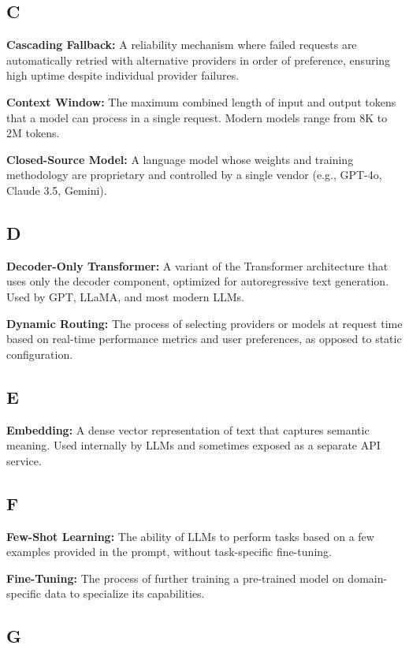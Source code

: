 \documentclass[english]{article}
\begin{document}
\subsection*{C}

\textbf{Cascading Fallback:} A reliability mechanism where failed requests are automatically retried with alternative providers in order of preference, ensuring high uptime despite individual provider failures.

\textbf{Context Window:} The maximum combined length of input and output tokens that a model can process in a single request. Modern models range from 8K to 2M tokens.

\textbf{Closed-Source Model:} A language model whose weights and training methodology are proprietary and controlled by a single vendor (e.g., GPT-4o, Claude 3.5, Gemini).

\subsection*{D}

\textbf{Decoder-Only Transformer:} A variant of the Transformer architecture that uses only the decoder component, optimized for autoregressive text generation. Used by GPT, LLaMA, and most modern LLMs.

\textbf{Dynamic Routing:} The process of selecting providers or models at request time based on real-time performance metrics and user preferences, as opposed to static configuration.

\subsection*{E}

\textbf{Embedding:} A dense vector representation of text that captures semantic meaning. Used internally by LLMs and sometimes exposed as a separate API service.

\subsection*{F}

\textbf{Few-Shot Learning:} The ability of LLMs to perform tasks based on a few examples provided in the prompt, without task-specific fine-tuning.

\textbf{Fine-Tuning:} The process of further training a pre-trained model on domain-specific data to specialize its capabilities.

\subsection*{G}
\end{document}

